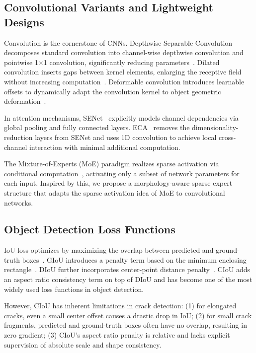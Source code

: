 \documentclass{ieeeaccess}
\begin{document}
{\subsection{Convolutional Variants and Lightweight Designs}

Convolution is the cornerstone of CNNs. Depthwise Separable Convolution decomposes standard convolution into channel-wise depthwise convolution and pointwise 1$\times$1 convolution, significantly reducing parameters~\cite{Chollet2017, Howard2017}. Dilated convolution inserts gaps between kernel elements, enlarging the receptive field without increasing computation~\cite{Yu2015}. Deformable convolution introduces learnable offsets to dynamically adapt the convolution kernel to object geometric deformation~\cite{Dai2017}.

In attention mechanisms, SENet~\cite{Hu2018} explicitly models channel dependencies via global pooling and fully connected layers. ECA~\cite{Wang2020} removes the dimensionality-reduction layers from SENet and uses 1D convolution to achieve local cross-channel interaction with minimal additional computation.

The Mixture-of-Experts (MoE) paradigm realizes sparse activation via conditional computation~\cite{Shazeer2017, Riquelme2021}, activating only a subset of network parameters for each input. Inspired by this, we propose a morphology-aware sparse expert structure that adapts the sparse activation idea of MoE to convolutional networks.

\subsection{Object Detection Loss Functions}

IoU loss optimizes by maximizing the overlap between predicted and ground-truth boxes~\cite{Yu2016}. GIoU introduces a penalty term based on the minimum enclosing rectangle~\cite{Rezatofighi2019}. DIoU further incorporates center-point distance penalty~\cite{Zheng2020}. CIoU adds an aspect ratio consistency term on top of DIoU and has become one of the most widely used loss functions in object detection.

However, CIoU has inherent limitations in crack detection: (1) for elongated cracks, even a small center offset causes a drastic drop in IoU; (2) for small crack fragments, predicted and ground-truth boxes often have no overlap, resulting in zero gradient; (3) CIoU's aspect ratio penalty is relative and lacks explicit supervision of absolute scale and shape consistency.

}
\end{document}
